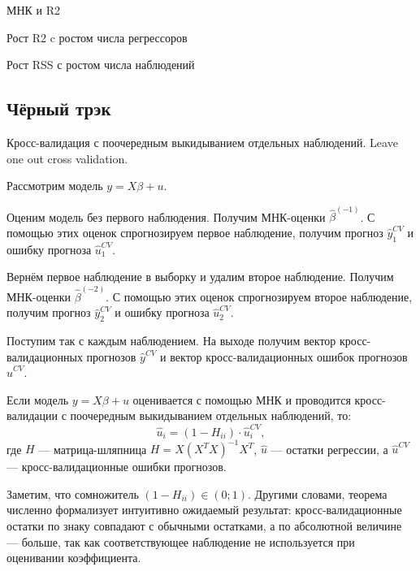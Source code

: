 \documentclass[12pt]{article}
\begin{document}
МНК и R2

Рост R2 c ростом числа регрессоров

Рост RSS с ростом числа наблюдений


\subsection{Чёрный трэк}

\begin{definition}
Кросс-валидация с поочередным выкидыванием отдельных наблюдений. 
Leave one out cross validation.

Рассмотрим модель $y=X\beta + u$. 

Оценим модель без первого наблюдения. Получим МНК-оценки $\hat\beta^{(-1)}$.
С помощью этих оценок спрогнозируем первое наблюдение, получим прогноз $\hat y_1^{CV}$ и ошибку прогноза $\hat u_1^{CV}$.

Вернём первое наблюдение в выборку и удалим второе наблюдение. Получим МНК-оценки $\hat\beta^{(-2)}$.
С помощью этих оценок спрогнозируем второе наблюдение, получим прогноз $\hat y_2^{CV}$ и ошибку прогноза $\hat u_2^{CV}$.

Поступим так с каждым наблюдением. На выходе получим вектор кросс-валидационных прогнозов $\hat y^{CV}$ и вектор кросс-валидационных ошибок прогнозов $\hat u^{CV}$.    
\end{definition}

\begin{theorem}
Если модель $y=X\beta + u$ оценивается с помощью МНК и проводится кросс-валидации с поочередным выкидыванием отдельных наблюдений, то:
\[
\hat u_i = (1 - H_{ii}) \cdot \hat u_i^{CV},
\]
где $H$ — матрица-шляпница $H = X(X^TX)^{-1}X^T$, $\hat u$ — остатки регрессии, а $\hat u^{CV}$ — кросс-валидационные ошибки прогнозов.
\end{theorem}

Заметим, что сомножитель $(1 - H_{ii}) \in (0;1)$. 
Другими словами, теорема численно формализует интуитивно ожидаемый результат: кросс-валидационные остатки по знаку совпадают с обычными остатками, а по абсолютной величине — больше, так как соответствующее наблюдение не используется при оценивании коэффициента. 
\end{document}
